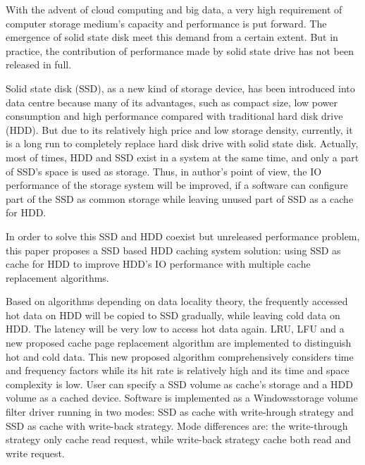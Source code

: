 
\begin{eabstract}

\noindent With the advent of cloud computing and big data, a very high requirement of computer storage medium's capacity and performance is put forward. The emergence of solid state disk meet this demand from a certain extent. But in practice, the contribution of performance made by solid state drive has not been released in full.
\vspace{1em}

\noindent Solid state disk (SSD), as a new kind of storage device, has been introduced into data centre because many of its advantages, such as compact size, low power consumption and high performance compared with traditional hard disk drive (HDD). But due to its relatively high price and low storage density, currently, it is a long run to completely replace hard disk drive with solid state disk. Actually, most of times, HDD and SSD exist in a system at the same time, and only a part of SSD's space is used as storage. Thus, in author's point of view, the IO performance of the storage system will be improved, if a software can configure part of the SSD as common storage while leaving unused part of SSD as a cache for HDD.
\vspace{1em}

\noindent In order to solve this SSD and HDD coexist but unreleased performance problem, this paper proposes a SSD based HDD caching system solution: using SSD as cache for HDD to improve HDD's IO performance with multiple cache replacement algorithms.
\vspace{1em}

\noindent Based on algorithms depending on data locality theory, the frequently accessed hot data on HDD will be copied to SSD gradually, while leaving cold data on HDD. The latency will be very low to access hot data again. LRU, LFU and a new proposed cache page replacement algorithm are implemented to distinguish hot and cold data. This new proposed algorithm comprehensively considers time and frequency factors while its hit rate is relatively high and its time and space complexity is low. User can specify a SSD volume as cache's storage and a HDD volume as a cached device. Software is implemented as a Windows\textregistered storage volume filter driver running in two modes: SSD as cache with write-hrough strategy and SSD as cache with write-back strategy. Mode differences are: the write-through strategy only cache read request, while write-back strategy cache both read and write request.
\vspace{1em}


\end{eabstract}
